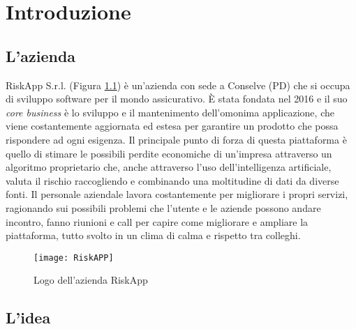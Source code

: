 \chapter{Introduzione}
\label{cap:introduzione}

%
%
%

\section{L'azienda}

RiskApp S.r.l. (Figura \ref{fig:riskapp}) è un'azienda con sede a Conselve (PD) che si occupa di sviluppo software per il mondo assicurativo.\newline
È stata fondata nel 2016 e il suo \textit{core business} è lo sviluppo e il mantenimento dell'omonima applicazione, che viene costantemente aggiornata ed estesa per garantire un prodotto che possa rispondere ad ogni esigenza.\newline
Il principale punto di forza di questa piattaforma è quello di stimare le possibili perdite economiche di un’impresa attraverso un algoritmo proprietario che, anche attraverso l’uso dell'intelligenza artificiale, valuta il rischio raccogliendo e combinando una moltitudine di dati da diverse fonti.\newline
Il personale aziendale lavora costantemente per migliorare i propri servizi, ragionando sui possibili problemi che l'utente e le aziende possono andare incontro, fanno riunioni e call per capire come migliorare e ampliare la piattaforma, tutto svolto in un clima di calma e rispetto tra colleghi.

\begin{figure}[!h] 
    \centering 
    \texttt{[image: RiskAPP]} 
    \caption{Logo dell'azienda RiskApp}\label{fig:riskapp}
\end{figure}

\newpage

\section{L'idea}

